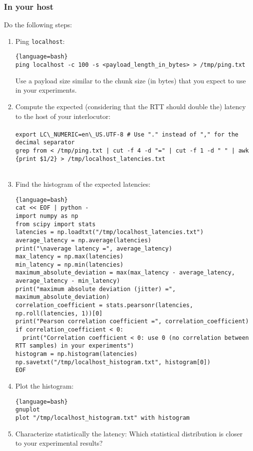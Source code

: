 \subsubsection{In your host}

Do the following steps:

\begin{enumerate}
\item Ping \verb|localhost|:
   \begin{lstlisting}{language=bash}
ping localhost -c 100 -s <payload_length_in_bytes> > /tmp/ping.txt
  \end{lstlisting}
  Use a payload size similar to the chunk size (in bytes) that you
  expect to use in your experiments.
\item Compute the expected (considering that the RTT should
  double the) latency to the host of your interlocutor:\\\\
  \verb|export LC\_NUMERIC=en\_US.UTF-8 # Use "." instead of "," for the decimal separator|\\
\texttt{grep from < /tmp/ping.txt | cut -f 4 -d "=" | cut -f 1 -d " " | awk
  \textquotesingle\{print \$1/2\}\textquotesingle~> /tmp/localhost\_latencies.txt}\\\\

\item Find the histogram of the expected latencies:
  
  \begin{lstlisting}{language=bash}
cat << EOF | python -
import numpy as np
from scipy import stats
latencies = np.loadtxt("/tmp/localhost_latencies.txt")
average_latency = np.average(latencies)
print("\naverage latency =", average_latency)
max_latency = np.max(latencies)
min_latency = np.min(latencies)
maximum_absolute_deviation = max(max_latency - average_latency, average_latency - min_latency)
print("maximum absolute deviation (jitter) =", maximum_absolute_deviation)
correlation_coefficient = stats.pearsonr(latencies, np.roll(latencies, 1))[0]
print("Pearson correlation coefficient =", correlation_coefficient)
if correlation_coefficient < 0:
  print("Correlation coefficient < 0: use 0 (no correlation between RTT samples) in your experiments")
histogram = np.histogram(latencies)
np.savetxt("/tmp/localhost_histogram.txt", histogram[0])
EOF
  \end{lstlisting}

\item Plot the histogram:
  \begin{lstlisting}{language=bash}
gnuplot
plot "/tmp/localhost_histogram.txt" with histogram
  \end{lstlisting}
  
\item Characterize statistically the latency: Which statistical
  distribution is closer to your experimental results?
\end{enumerate}


